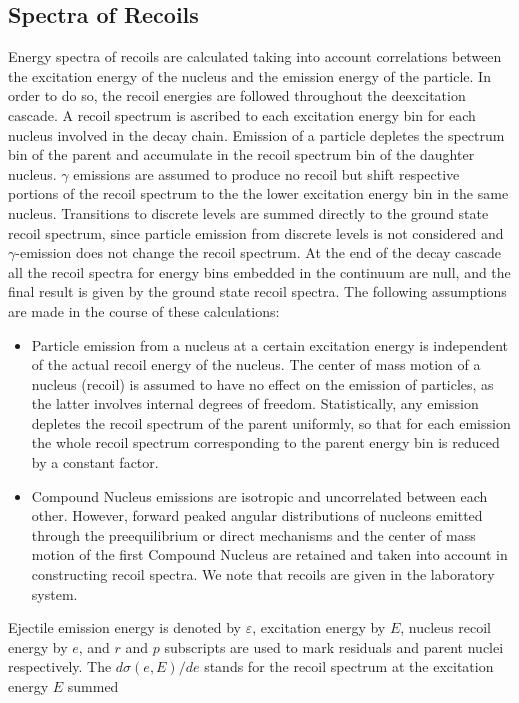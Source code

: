 \documentclass[twocolumn,amsmath,amssymb,10pt,groupedaddress,letter]{revtex4}
\begin{document}
\subsection{Spectra of Recoils}
Energy spectra of recoils are calculated taking into account correlations
between the excitation energy of the nucleus and the emission energy
of the particle. In order to do so, the recoil energies are followed
throughout the deexcitation cascade. A recoil spectrum is ascribed
to each excitation energy bin for each nucleus involved in the decay
chain. Emission of a particle depletes the spectrum bin of the parent
and accumulate in the recoil spectrum bin of the daughter nucleus.
$\gamma$ emissions are assumed to produce no recoil but shift respective
portions of the recoil spectrum to the the lower excitation energy
bin in the same nucleus. Transitions to discrete levels are summed
directly to the ground state recoil spectrum, since particle emission
from discrete levels is not considered and $\gamma$-emission does
not change the recoil spectrum. At the end of the decay cascade all
the recoil spectra for energy bins embedded in the continuum are null,
and the final result is given by the ground state recoil spectra.
The following assumptions are made in the course of these calculations:
\begin{itemize}
\item Particle emission from a nucleus at a certain excitation energy is
independent of the actual recoil energy of the nucleus. The center
of mass motion of a nucleus (recoil) is assumed to have no effect
on the emission of particles, as the latter involves internal degrees
of freedom. Statistically, any emission depletes the recoil spectrum
of the parent uniformly, so that for each emission the whole recoil
spectrum corresponding to the parent energy bin is reduced by a constant
factor.
\item Compound Nucleus emissions are isotropic and uncorrelated between
each other. However, forward peaked angular distributions of nucleons
emitted through the preequilibrium or direct mechanisms and the center
of mass motion of the first Compound Nucleus are retained and taken
into account in constructing recoil spectra. We note that recoils
are given in the laboratory system.
\end{itemize}
Ejectile emission energy is denoted by $\varepsilon$, excitation
energy by $E$, nucleus recoil energy by $e$, and $r$ and $p$ subscripts
are used to mark residuals and parent nuclei respectively. The $d\sigma(e,E)/de$
stands for the recoil spectrum at the excitation energy $E$ summed
\end{document}
